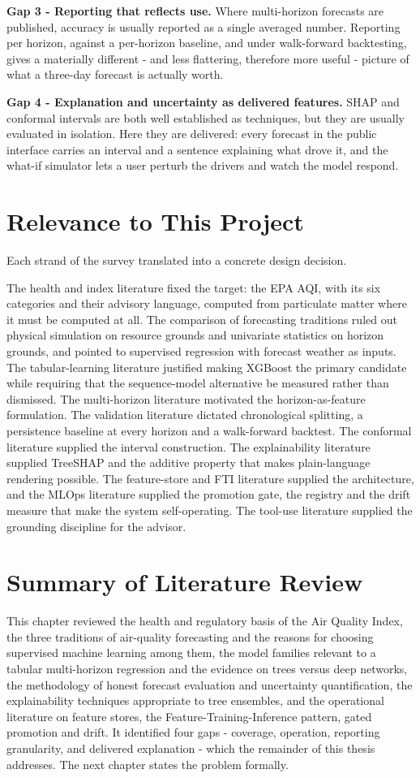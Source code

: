 \textbf{Gap 3 - Reporting that reflects use.} Where multi-horizon forecasts are
published, accuracy is usually reported as a single averaged number. Reporting
per horizon, against a per-horizon baseline, and under walk-forward backtesting,
gives a materially different - and less flattering, therefore more useful -
picture of what a three-day forecast is actually worth.

\textbf{Gap 4 - Explanation and uncertainty as delivered features.} SHAP and
conformal intervals are both well established as techniques, but they are usually
evaluated in isolation. Here they are delivered: every forecast in the public
interface carries an interval and a sentence explaining what drove it, and the
what-if simulator lets a user perturb the drivers and watch the model respond.

\section{Relevance to This Project}
Each strand of the survey translated into a concrete design decision.

The health and index literature fixed the target: the EPA AQI, with its six
categories and their advisory language, computed from particulate matter where it
must be computed at all. The comparison of forecasting traditions ruled out
physical simulation on resource grounds and univariate statistics on horizon
grounds, and pointed to supervised regression with forecast weather as inputs.
The tabular-learning literature justified making XGBoost the primary candidate
while requiring that the sequence-model alternative be measured rather than
dismissed. The multi-horizon literature motivated the horizon-as-feature
formulation. The validation literature dictated chronological splitting, a
persistence baseline at every horizon and a walk-forward backtest. The conformal
literature supplied the interval construction. The explainability literature
supplied TreeSHAP and the additive property that makes plain-language rendering
possible. The feature-store and FTI literature supplied the architecture, and the
MLOps literature supplied the promotion gate, the registry and the drift measure
that make the system self-operating. The tool-use literature supplied the
grounding discipline for the advisor.

\section{Summary of Literature Review}
This chapter reviewed the health and regulatory basis of the Air Quality Index,
the three traditions of air-quality forecasting and the reasons for choosing
supervised machine learning among them, the model families relevant to a tabular
multi-horizon regression and the evidence on trees versus deep networks, the
methodology of honest forecast evaluation and uncertainty quantification, the
explainability techniques appropriate to tree ensembles, and the operational
literature on feature stores, the Feature-Training-Inference pattern, gated
promotion and drift. It identified four gaps - coverage, operation, reporting
granularity, and delivered explanation - which the remainder of this thesis
addresses. The next chapter states the problem formally.
